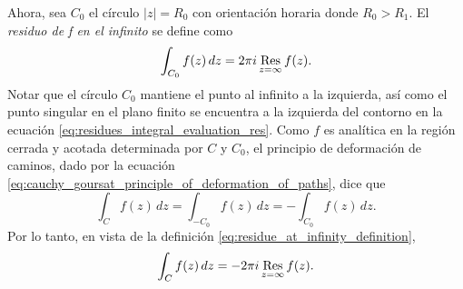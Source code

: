 \documentclass[a4paper]{report}
\def\Res{\qopname\relax m{Res}}
\begin{document}
Ahora, sea \(C_0\) el círculo \(|z|=R_0\) con orientación horaria donde \(R_0>R_1\). El \emph{residuo de f en el infinito} se define como
\begin{equation}\label{eq:residue_at_infinity_definition}
 \int_{C_0}f(z)\,dz=2\pi i\Res_{z=\infty}f(z). 
\end{equation}
Notar que el círculo \(C_0\) mantiene el punto al infinito a la izquierda, así como el punto singular en el plano finito se encuentra a la izquierda del contorno en la ecuación \ref{eq:residues_integral_evaluation_res}. Como \(f\) es analítica en la región cerrada y acotada determinada por \(C\) y \(C_0\), el principio de deformación de caminos, dado por la ecuación \ref{eq:cauchy_goursat_principle_of_deformation_of_paths}, dice que 
\begin{equation}\label{eq:residue_at_infinity_path_deformation_tmp}
 \int_Cf(z)\,dz=\int_{-C_0}f(z)\,dz=-\int_{C_0}f(z)\,dz. 
\end{equation}
Por lo tanto, en vista de la definición \ref{eq:residue_at_infinity_definition},
\begin{equation}\label{eq:residue_at_infinity_C_tmp}
 \int_Cf(z)\,dz=-2\pi i\Res_{z=\infty}f(z). 
\end{equation}
\end{document}
